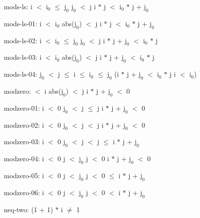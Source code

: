 \documentclass[a4paper]{article}
\begin{document}
\item	mods-ls:  \Fol i $<$ $\mbox{i}_{0}$  $\le$ $\mbox{j}_{0}$ \And $\mbox{j}_{0}$ $<$ j \Imp i $*$ j $<$ $\mbox{i}_{0}$ $*$ j + $\mbox{j}_{0}$

\item	mods-ls-01:  \Fol i $<$ $\mbox{i}_{0}$ \And abs($\mbox{j}_{0}$) $<$ j \Imp i $*$ j $<$ $\mbox{i}_{0}$ $*$ j + $\mbox{j}_{0}$

\item	mods-ls-02:  \Fol i $<$ $\mbox{i}_{0}$  $\le$ $\mbox{j}_{0}$ \And $\mbox{j}_{0}$ $<$ j \Imp i $*$ j + $\mbox{j}_{0}$ $<$ $\mbox{i}_{0}$ $*$ j

\item	mods-ls-03:  \Fol i $<$ $\mbox{i}_{0}$ \And abs($\mbox{j}_{0}$) $<$ j \Imp i $*$ j + $\mbox{j}_{0}$ $<$ $\mbox{i}_{0}$ $*$ j

\item	mods-ls-04:  \Fol $\mbox{j}_{0}$ $<$ j  $\le$ i  $\le$ $\mbox{i}_{0}$  $\le$ $\mbox{j}_{0}$ \Imp (i $*$ j + $\mbox{j}_{0}$ $<$ $\mbox{i}_{0}$ $*$ j \Equiv i $<$ $\mbox{i}_{0}$)

\item	modzero:   $<$ i \And abs($\mbox{j}_{0}$) $<$ j \Imp \Not i $*$ j + $\mbox{j}_{0}$ $<$ 0

\item	modzero-01:  \Fol i $<$ 0 \And $\mbox{j}_{0}$ $<$ j  $\le$ j \Imp i $*$ j + $\mbox{j}_{0}$ $<$ 0

\item	modzero-02:  \Fol i $<$ 0 \And $\mbox{j}_{0}$ $<$ j  $<$ j \Imp i $*$ j + $\mbox{j}_{0}$ $<$ 0

\item	modzero-03:  \Fol i $<$ 0 \And $\mbox{j}_{0}$ $<$ j  $<$ j \Imp {} $\le$ i $*$ j + $\mbox{j}_{0}$

\item	modzero-04:  \Fol i $<$ 0 \And j $<$ $\mbox{j}_{0}$ \And j $<$ 0 \Imp \Not i $*$ j + $\mbox{j}_{0}$ $<$ 0

\item	modzero-05:  \Fol i $<$ 0 \And j $<$ $\mbox{j}_{0}$ \And j $<$ 0  $\le$ i $*$ j + $\mbox{j}_{0}$

\item	modzero-06:  \Fol i $<$ 0 \And j $<$ $\mbox{j}_{0}$ \And j $<$ 0  $<$ i $*$ j + $\mbox{j}_{0}$

\item	neq-two:  \Fol (1 + 1) $*$ i $\neq$ 1
\end{document}
